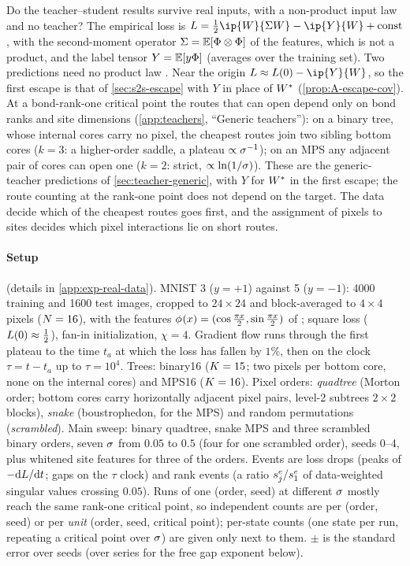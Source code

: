 Do the teacher--student results survive real inputs, with a non-product input law and no teacher? The
empirical loss is $\Loss=\frac12\ip{\W}{\Sig\W}-\ip{Y}{\W}+\mathrm{const}$, with the second-moment operator
$\Sigma=\mathbb{E}[\Phi\otimes\Phi]$ of the features, which is not a product, and the label tensor $Y=\mathbb{E}[y\Phi]$ (averages over the training set). Two
predictions need no product law \derived. Near the origin $\Loss\approx\Loss(0)-\ip{Y}{\W}$, so the first
escape is that of \cref{sec:s2s-escape} with $Y$ in place of $W^{*}$ (\cref{prop:A-escape-cov}). At a bond-rank-one
critical point the routes that can open depend only on bond ranks and site dimensions (\cref{app:teachers},
``Generic teachers''): on a binary tree, whose internal cores carry no pixel, the cheapest routes join
two sibling bottom cores ($k=3$: a higher-order saddle, a plateau $\propto\sigma^{-1}$); on an MPS any adjacent
pair of cores can open one ($k=2$: strict, $\propto\ln(1/\sigma)$). These are the generic-teacher predictions
of \cref{sec:teacher-generic}, with $Y$ for $W^{*}$ in the first escape; the route counting at the rank-one
point does not depend on the target. The data decide which of the cheapest routes goes first,
and the assignment of pixels to sites decides which pixel interactions lie on short routes.

\paragraph{Setup} (details in \cref{app:exp-real-data}).
MNIST 3 ($y=+1$) against 5 ($y=-1$): 4000 training and 1600 test images, cropped to $24\times24$ and
block-averaged to $4\times4$ pixels ($N=16$), with the features $\phi_{}(x)=(\cos\frac{\pi x}2,\sin\frac{\pi x}2)$
of \citet{stoudenmire2016supervised}; square loss ($L(0)\approx\frac12$), fan-in initialization, $\chi=4$.
Gradient flow runs through the first plateau to the time $t_a$ at which the loss has fallen by $1\%$,
then on the clock $\tau=t-t_a$ up to $\tau=10^4$. Trees: binary16 ($K=15$; two pixels per bottom core,
none on the internal cores) and MPS16 ($K=16$). Pixel orders: \emph{quadtree} (Morton order; bottom cores
carry horizontally adjacent pixel pairs, level-2 subtrees $2\times2$ blocks), \emph{snake} (boustrophedon, for
the MPS) and random permutations (\emph{scrambled}). Main sweep: binary quadtree, snake MPS and three
scrambled binary orders, seven $\sigma$ from $0.05$ to $0.5$ (four for one scrambled order), seeds 0--4, plus
whitened site features for three of the orders. Events are loss drops (peaks of $-\mathrm{d}L/\mathrm{d} t$; gaps on
the $\tau$ clock) and rank events (a ratio $s^{e}_{j}/s^{e}_{1}$ of data-weighted singular values crossing $0.05$). Runs
of one (order, seed) at different $\sigma$ mostly reach the same rank-one critical point, so independent
counts are per (order, seed) or per \emph{unit} (order, seed, critical point); per-state counts (one state
per run, repeating a critical point over $\sigma$) are given only next to them. $\pm$ is the standard error over
seeds (over series for the free gap exponent below).

